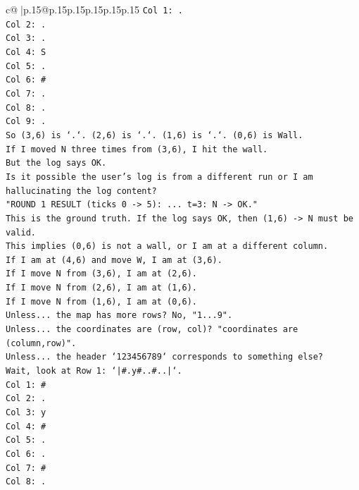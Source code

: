 \documentclass{article}
\begin{document}
{\begin{supertabular}{c@{$\;$}|p{.15\linewidth}@{}p{.15\linewidth}p{.15\linewidth}p{.15\linewidth}p{.15\linewidth}p{.15\linewidth}}
{{{\texttt{Col 1: .} \\
\texttt{Col 2: .} \\
\texttt{Col 3: .} \\
\texttt{Col 4: S} \\
\texttt{Col 5: .} \\
\texttt{Col 6: \#} \\
\texttt{Col 7: .} \\
\texttt{Col 8: .} \\
\texttt{Col 9: .} \\
\texttt{So (3,6) is `.`. (2,6) is `.`. (1,6) is `.`. (0,6) is Wall.} \\
\texttt{If I moved N three times from (3,6), I hit the wall.} \\
\texttt{But the log says OK.} \\
\texttt{Is it possible the user's log is from a different run or I am hallucinating the log content?} \\
\texttt{"ROUND 1 RESULT (ticks 0 {-}> 5): ... t=3: N {-}> OK."} \\
\texttt{This is the ground truth. If the log says OK, then (1,6) {-}> N must be valid.} \\
\texttt{This implies (0,6) is not a wall, or I am at a different column.} \\
\texttt{If I am at (4,6) and move W, I am at (3,6).} \\
\texttt{If I move N from (3,6), I am at (2,6).} \\
\texttt{If I move N from (2,6), I am at (1,6).} \\
\texttt{If I move N from (1,6), I am at (0,6).} \\
\texttt{Unless... the map has more rows? No, "1...9".} \\
\texttt{Unless... the coordinates are (row, col)? "coordinates are (column,row)".} \\
\texttt{Unless... the header `123456789` corresponds to something else?} \\
\texttt{Wait, look at Row 1: `|\#.y\#..\#..|`.} \\
\texttt{Col 1: \#} \\
\texttt{Col 2: .} \\
\texttt{Col 3: y} \\
\texttt{Col 4: \#} \\
\texttt{Col 5: .} \\
\texttt{Col 6: .} \\
\texttt{Col 7: \#} \\
\texttt{Col 8: .} \\
}}}
\end{supertabular}}
\end{document}
